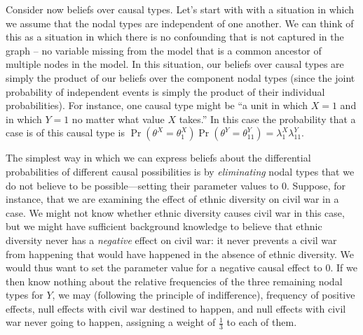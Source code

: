 \documentclass[
  12pt,
]{book}
\begin{document}
Consider now beliefs over causal types. Let's start with with a situation in which we assume that the nodal types are independent of one another. We can think of this as a situation in which there is no confounding that is not captured in the graph -- no variable missing from the model that is a common ancestor of multiple nodes in the model. In this situation, our beliefs over causal types are simply the product of our beliefs over the component nodal types (since the joint probability of independent events is simply the product of their individual probabilities). For instance, one causal type might be ``a unit in which \(X=1\) and in which \(Y=1\) no matter what value \(X\) takes.'' In this case the probability that a case is of this causal type is \(\Pr(\theta^X = \theta^X_1)\Pr(\theta^Y = \theta^Y_{11}) = \lambda^X_1\lambda^Y_{11}\).

The simplest way in which we can express beliefs about the differential probabilities of different causal possibilities is by \emph{eliminating} nodal types that we do not believe to be possible---setting their parameter values to \(0\). Suppose, for instance, that we are examining the effect of ethnic diversity on civil war in a case. We might not know whether ethnic diversity causes civil war in this case, but we might have sufficient background knowledge to believe that ethnic diversity never has a \emph{negative} effect on civil war: it never prevents a civil war from happening that would have happened in the absence of ethnic diversity. We would thus want to set the parameter value for a negative causal effect to \(0\). If we then know nothing about the relative frequencies of the three remaining nodal types for \(Y\), we may (following the principle of indifference), frequency of positive effects, null effects with civil war destined to happen, and null effects with civil war never going to happen, assigning a weight of \(\frac{1}{3}\) to each of them.
\end{document}
